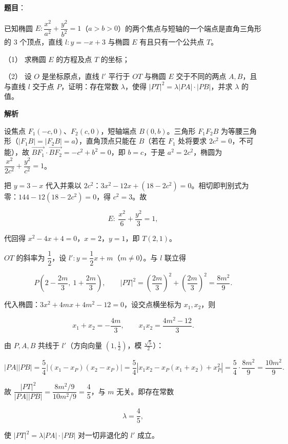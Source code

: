 \begin{answer}

\textbf{题目}：

已知椭圆 \(E:\dfrac{x^{2}}{a^{2}}+\dfrac{y^{2}}{b^{2}}=1\)（\(a>b>0\)）的两个焦点与短轴的一个端点是直角三角形的 \(3\) 个顶点，直线 \(l:y=-x+3\) 与椭圆 \(E\) 有且只有一个公共点 \(T\)。

（1） 求椭圆 \(E\) 的方程及点 \(T\) 的坐标；

（2） 设 \(O\) 是坐标原点，直线 \(l'\) 平行于 \(OT\) 与椭圆 \(E\) 交于不同的两点 \(A,B\)，且与直线 \(l\) 交于点 \(P\)，证明：存在常数 \(\lambda\)，使得 \(|PT|^{2}=\lambda|PA|\cdot|PB|\)，并求 \(\lambda\) 的值。

\textbf{解析}


设焦点 \(F_1(-c,0)\)、\(F_2(c,0)\)，短轴端点 \(B(0,b)\)。三角形 \(F_1F_2B\) 为等腰三角形（\(|F_1B|=|F_2B|=a\)），直角顶点只能在 \(B\)（若在 \(F_1\) 处将要求 \(2c^{2}=0\)，不可能），故 \(\overrightarrow{BF_1}\cdot\overrightarrow{BF_2}=-c^{2}+b^{2}=0\)，即 \(b=c\)，于是 \(a^{2}=2c^{2}\)，椭圆为 \(\dfrac{x^{2}}{2c^{2}}+\dfrac{y^{2}}{c^{2}}=1\)。

把 \(y=3-x\) 代入并乘以 \(2c^{2}\)：\(3x^{2}-12x+(18-2c^{2})=0\)。相切即判别式为零：\(144-12(18-2c^{2})=0\)，得 \(c^{2}=3\)。故

\nopagebreak[4]
\[
E:\ \frac{x^{2}}{6}+\frac{y^{2}}{3}=1,
\]

代回得 \(x^{2}-4x+4=0\)，\(x=2\)，\(y=1\)，即 \(T(2,1)\)。


\(OT\) 的斜率为 \(\dfrac{1}{2}\)，设 \(l':y=\dfrac{1}{2}x+m\)（\(m\neq0\)）。与 \(l\) 联立得

\nopagebreak[4]
\[
P\left(2-\frac{2m}{3},\ 1+\frac{2m}{3}\right),\qquad
|PT|^{2}=\left(\frac{2m}{3}\right)^{2}+\left(\frac{2m}{3}\right)^{2}=\frac{8m^{2}}{9}.
\]

代入椭圆：\(3x^{2}+4mx+4m^{2}-12=0\)，设交点横坐标为 \(x_1,x_2\)，则

\nopagebreak[4]
\[
x_1+x_2=-\frac{4m}{3},\qquad x_1x_2=\frac{4m^{2}-12}{3}.
\]

由 \(P,A,B\) 共线于 \(l'\)（方向向量 \((1,\tfrac12)\)，模 \(\tfrac{\sqrt5}{2}\)）：

\nopagebreak[4]
\[
|PA||PB|=\frac{5}{4}\left|(x_1-x_P)(x_2-x_P)\right|
=\frac{5}{4}\left|x_1x_2-x_P(x_1+x_2)+x_P^{2}\right|=\frac{5}{4}\cdot\frac{8m^{2}}{9}=\frac{10m^{2}}{9}.
\]

故 \(\dfrac{|PT|^{2}}{|PA||PB|}=\dfrac{8m^{2}/9}{10m^{2}/9}=\dfrac{4}{5}\)，与 \(m\) 无关。即存在常数

\nopagebreak[4]
\[
\lambda=\frac{4}{5},
\]

使 \(|PT|^{2}=\lambda|PA|\cdot|PB|\) 对一切非退化的 \(l'\) 成立。



\end{answer}
